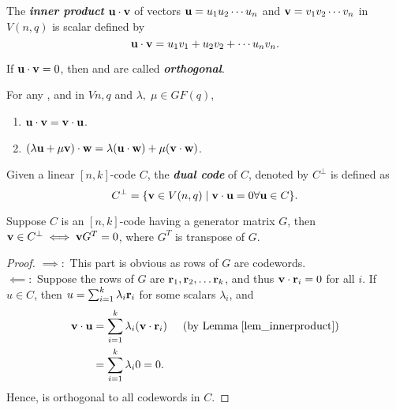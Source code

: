 \documentclass[../main.tex]{subfiles}
\begin{document}
	
\begin{defn}
	The \textbf{\emph{inner product}} $\textbf{u}\cdot \textbf{v}$ of vectors $\textbf{u}=u_1u_2\cdots u_n$ and $\textbf{v}=v_1v_2\cdots v_n$ in $V(n,q)$ is scalar defined by
	\[
		\textbf{u}\cdot \textbf{v} = u_1v_1 + u_2v_2+\cdots u_nv_n.
	\]
\end{defn}	
If $\textbf{u}\cdot \textbf{v}=0$, then  and  are called \textbf{\emph{orthogonal}}.\\

\begin{lem}\label{lem_innerproduct}
	For any ,  and  in $V{n,q}$ and $\lambda,\; \mu \in GF(q)$, 
	\begin{enumerate}
	\itemsep-1mm
		\item $\textbf{u}\cdot \textbf{v} = \textbf{v} \cdot \textbf{u}$.
		\item $(\lambda \textbf{u}+\mu \textbf{v})\cdot \textbf{w} = \lambda(\textbf{u}\cdot \textbf{w})+ \mu(\textbf{v}\cdot \textbf{w})$.
	\end{enumerate}
\end{lem}

\begin{defn}
	Given a linear $[n,k]$-code $C$, the \textbf{\emph{dual code}} of $C$, denoted by $C^{\perp}$ is defined as
	\[
		C^{\perp} = \{\textbf{v}\in V(n,q) \;|\; \textbf{v}\cdot \textbf{u}=0 \forall \textbf{u} \in C\}.
	\]
\end{defn}

\begin{lem}\label{lem_dual-necessary}
	Suppose $C$ is an $[n,k]$-code having a generator matrix $G$, then $\textbf{v}\in C^{\perp} \iff \textbf{v}G^T=0$, where $G^T$ is transpose of $G$.
\end{lem}
\begin{proof}
	$\implies :$ This part is obvious as rows of $G$ are codewords.\\
	$\impliedby :$ Suppose the rows of $G$ are $\textbf{r}_1,\textbf{r}_2,\ldots \textbf{r}_k$, and thus $\textbf{v}\cdot \textbf{r}_i=0$ for all $i$. If $u\in C$, then $u=\sum_{i=1}^{k}\lambda_i\textbf{r}_i$ for some scalars $\lambda_i$, and
	\begin{align*}
		\textbf{v}\cdot \textbf{u} &=\displaystyle\sum_{i=1}^{k}\lambda_i(\textbf{v}\cdot \textbf{r}_i)\hspace{5mm} (\text{by Lemma}\; \ref{lem_innerproduct})\\
		&=\displaystyle\sum_{i=1}^k\lambda_i0=0.
	\end{align*}
	Hence,  is orthogonal to all codewords in $C$.
\end{proof}
\end{document}
